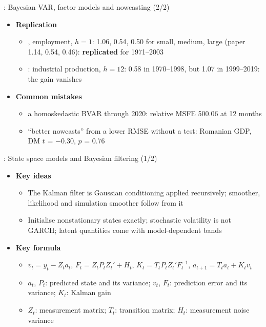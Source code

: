 \begin{frame}{: Bayesian VAR, factor models and nowcasting (2/2)}
\itemsize{\small}
\begin{itemize}
    \item \textbf{Replication}
    \begin{itemize}
        \item {}, employment, $h = 1$: 1.06, 0.54, 0.50 for small, medium, large (paper 1.14, 0.54, 0.46): \textbf{replicated} for 1971--2003
        \item {}: industrial production, $h = 12$: 0.58 in 1970--1998, but 1.07 in 1999--2019: the gain vanishes
    \end{itemize}
    \item \textbf{Common mistakes}
    \begin{itemize}
        \item a homoskedastic BVAR through 2020: relative MSFE 500.06 at 12 months
        \item ``better nowcasts'' from a lower RMSE without a test: Romanian GDP, DM $t$ = \ensuremath{-}0.30, $p$ = 0.76
    \end{itemize}
\end{itemize}
\end{frame}

\begin{frame}{: State space models and Bayesian filtering (1/2)}
\itemsize{\footnotesize}
\begin{itemize}
    \item \textbf{Key ideas}
    \begin{itemize}
        \item The Kalman filter is Gaussian conditioning applied recursively; smoother, likelihood and simulation smoother follow from it
        \item Initialise nonstationary states exactly; stochastic volatility is not GARCH; latent quantities come with model-dependent bands
    \end{itemize}
    \item \textbf{Key formula}
    \begin{itemize}
        \item $v_t = y_t - Z_ta_t$, $F_t = Z_tP_tZ_t' + H_t$, $K_t = T_tP_tZ_t'F_t^{-1}$, $a_{t+1} = T_ta_t + K_tv_t$
        \item $a_t$, $P_t$: predicted state and its variance; $v_t$, $F_t$: prediction error and its variance; $K_t$: Kalman gain
        \item $Z_t$: measurement matrix; $T_t$: transition matrix; $H_t$: measurement noise variance
    \end{itemize}
\end{itemize}
\end{frame}

